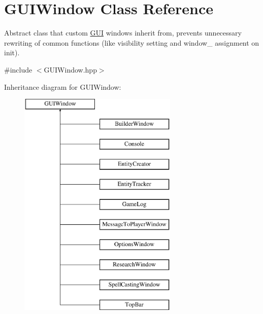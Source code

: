 \hypertarget{class_g_u_i_window}{}\section{G\+U\+I\+Window Class Reference}
\label{class_g_u_i_window}


Abstract class that custom \hyperlink{class_g_u_i}{G\+UI} windows inherit from, prevents unnecessary rewriting of common functions (like visibility setting and window\+\_\+ assignment on init).  




{\ttfamily \#include $<$G\+U\+I\+Window.\+hpp$>$}

Inheritance diagram for G\+U\+I\+Window\+:\begin{figure}[H]
\begin{center}
\leavevmode
\includegraphics[height=11.000000cm]{class_g_u_i_window}
\end{center}
\end{figure}
